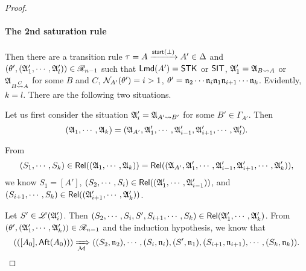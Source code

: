 \begin{proof}


\paragraph*{The 2nd saturation rule} Then there are a transition rule $\tau = A \xrightarrow{{\mathsf{start} }(\bot)} A'  \in \Delta$ and $(\theta', ({\mathfrak{A} }'_1, \cdots, {\mathfrak{A} }'_l)) \in \mathscr{R}_{n-1}$ such that ${\sf Lmd}(A')=\mathsf{STK}$ or ${\sf SIT}$, ${\mathfrak{A} }'_1 = {\mathfrak{A} }_{B \rightsquigarrow A}$ or ${\mathfrak{A} }_{B \stackrel{C}{\rightsquigarrow} A}$ for some $B$ and $C$, $\mathcal{N}_{A'}(\theta') = i > 1$, 
$\theta' = \mathfrak{n}_2  \cdots  \mathfrak{n}_{i} \mathfrak{n}_1  \mathfrak{n}_{i+1}  \cdots  \mathfrak{n}_k$.
Evidently, $k = l$. There are the following two situations. 

Let us first consider the situation ${\mathfrak{A} }_i' = {\mathfrak{A} }_{A'\rightsquigarrow B'}$ for some $B' \in \Gamma_{A'}$. 
Then 
%
$$({\mathfrak{A} }_1, \cdots, {\mathfrak{A} }_k) = ({\mathfrak{A} }_{A'}, {\mathfrak{A} }'_1, \cdots, {\mathfrak{A} }'_{i-1}, {\mathfrak{A} }'_{i+1}, \cdots, {\mathfrak{A} }'_l).$$  

From 
%
$$(S_1, \cdots, S_k) \in \mathsf{Rel}(({\mathfrak{A} }_1, \cdots, {\mathfrak{A} }_k)) = \mathsf{Rel}(({\mathfrak{A} }_{A'}, {\mathfrak{A} }'_1, \cdots, {\mathfrak{A} }'_{i-1}, {\mathfrak{A} }'_{i+1}, \cdots, {\mathfrak{A} }'_k)),$$ 
%
we know $S_1 = [A']$, $(S_2, \cdots, S_i) \in \mathsf{Rel}(({\mathfrak{A} }'_1, \cdots, {\mathfrak{A} }'_{i-1}))$, and $(S_{i+1}, \cdots, S_k) \in \mathsf{Rel}(({\mathfrak{A} }'_{i+1}, \cdots, {\mathfrak{A} }'_k))$. 

Let $S' \in {\mathscr{L} }({\mathfrak{A} }'_i)$. Then $(S_2, \cdots, S_i, S', S_{i+1}, \cdots, S_k) \in \mathsf{Rel}({\mathfrak{A} }'_1, \cdots, {\mathfrak{A} }'_k)$.
From $(\theta', ({\mathfrak{A} }'_1, \cdots, {\mathfrak{A} }'_k)) \in \mathscr{R}_{n-1}$ and the induction hypothesis, we know that  
%
$$(([A_0], {\sf Aft}(A_0))) \xRightarrow[{\mathcal{M} }]{} ((S_2, \mathfrak{n}_2), \cdots, (S_i, \mathfrak{n}_i), (S', \mathfrak{n}_1), (S_{i+1}, \mathfrak{n}_{i+1}), \cdots, (S_k, \mathfrak{n}_k)).$$ 


\end{proof}

